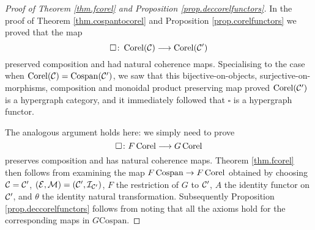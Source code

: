 \begin{proof}[Proof of Theorem \ref{thm.fcorel} and Proposition
  \ref{prop.deccorelfunctors}]
  In the proof of Theorem \ref{thm.cospantocorel} and Proposition
  \ref{prop.corelfunctors} we proved that the map 
  \[
    \square{\colon} \operatorname{{Corel}}(\mathcal C) \longrightarrow \operatorname{{Corel}}(\mathcal C')
  \]
  preserved composition and had natural coherence maps. Specialising to the case
  when $\operatorname{{Corel}}(\mathcal C)=\operatorname{{Cospan}}(\mathcal C')$, we saw that this bijective-on-objects,
  surjective-on-morphisms, composition and monoidal product preserving map
  proved $\operatorname{{Corel}}(\mathcal C')$ is a hypergraph category, and it immediately followed
  that $\square$ is a hypergraph functor.

  The analogous argument holds here: we simply need to prove
  \[
    \square{\colon} F\operatorname{{Corel}} \longrightarrow G\operatorname{{Corel}}
  \]
  preserves composition and has natural coherence maps. Theorem \ref{thm.fcorel}
  then follows from examining the map $F\operatorname{{Cospan}} \to F\operatorname{{Corel}}$ obtained by
  choosing $\mathcal C = \mathcal C'$, $(\mathcal E,\mathcal M) = (\mathcal C', \mathcal I_{\mathcal C'})$, $F$ the
  restriction of $G$ to $\mathcal C'$, $A$ the identity functor on $\mathcal C'$, and
  $\theta$ the identity natural transformation. Subsequently Proposition
  \ref{prop.deccorelfunctors} follows from noting that all the axioms hold for
  the corresponding maps in $G\mathrm{Cospan}$.
  

\end{proof}
